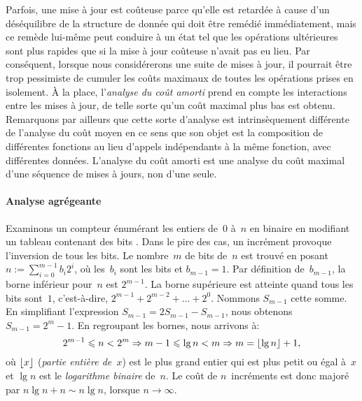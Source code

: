 \label{par:amortised_cost}

Parfois, une mise à jour est coûteuse parce qu'elle est retardée à
cause d'un déséquilibre de la structure de donnée qui doit être
remédié immédiatement, mais ce remède lui-même peut conduire à un état
tel que les opérations ultérieures sont plus rapides que si la mise à
jour coûteuse n'avait pas eu lieu. Par conséquent, lorsque nous
considérerons une suite de mises à jour, il pourrait être trop
pessimiste de cumuler les coûts maximaux de toutes les opérations
prises en isolement. À la place, l'\emph{analyse du coût amorti}
\citep{Okasaki_1998a} \citep[\S{}17]{CLRS_2009} prend en compte les interactions entre les mises à jour, de
telle sorte qu'un coût maximal plus bas est obtenu. Remarquons par
ailleurs que cette sorte d'analyse est intrinsèquement différente de
l'analyse du coût moyen en ce sens que son objet est la composition de
différentes fonctions au lieu d'appels indépendants à la même
fonction, avec différentes données. L'analyse du coût amorti est une
analyse du coût maximal d'une séquence de mises à jours, non d'une
seule.

\paragraph{Analyse agrégeante}
\label{par:aggregate}

Examinons un compteur énumérant les entiers de~\(0\) à~\(n\) en
binaire en modifiant un tableau contenant des bits
\cite[\S{}17.1]{CLRS_2009}. Dans le pire des cas, un incrément
provoque l'inversion de tous les bits. Le nombre~\(m\) de bits
de~\(n\) est trouvé en posant \(n := \sum_{i=0}^{m-1}{b_i2^i}\), où
les~\(b_i\) sont les bits et \(b_{m-1}=1\). Par définition
de~\(b_{m-1}\), la borne inférieur pour~\(n\) est \(2^{m-1}\). La
borne supérieure est atteinte quand tous les bits sont~\(1\),
c'est-à-dire, \(2^{m-1} + 2^{m-2} + \ldots + 2^0\). Nommons
\(S_{m-1}\) cette somme. En simplifiant l'expression \(S_{m-1} = 2
S_{m-1} - S_{m-1}\), nous obtenons \(S_{m-1} = 2^m - 1\). En regroupant
les bornes, nous arrivons à:
\begin{equation}
2^{m-1} \leqslant n < 2^m \Rightarrow m - 1 \leqslant \lg n
< m \Rightarrow m = \lfloor{\lg n}\rfloor + 1,
\label{eq:num_of_bits}
\end{equation}
où \(\lfloor{x}\rfloor\) (\textsl{partie entière de~\(x\)}) est
le plus grand entier qui est plus petit ou égal à~\(x\) et \(\lg n\)
est le \emph{logarithme binaire} de~\(n\). Le coût de \(n\)~incréments
est donc majoré par \(n\lg n + n \sim n\lg n\), lorsque \(n
\rightarrow \infty\).

